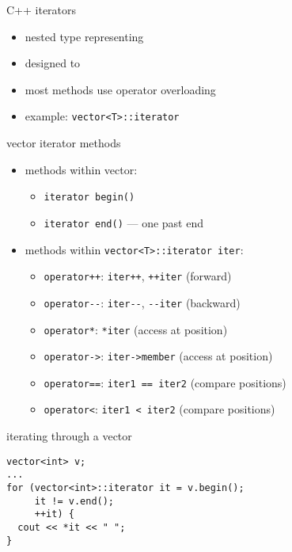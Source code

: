 \begin{frame}{C++ iterators}
    \begin{itemize}
        \item nested type representing 
        \item designed to 
        \item most methods use operator overloading
        \item example: \texttt{vector<T>::iterator}
    \end{itemize}
\end{frame}

\begin{frame}[fragile,label=itMethods]{vector iterator methods}
\lstset{
    language=C++,
    style=smaller,
}
\begin{itemize}
\item methods within vector:
    \begin{itemize}
    \item \lstinline|iterator begin()|
    \item \lstinline|iterator end()| --- one past end
    \end{itemize}
\item methods within \lstinline|vector<T>::iterator iter|:
    \begin{itemize}
        \item \lstinline|operator++|: \lstinline|iter++|, \lstinline|++iter| (forward)
        \item \lstinline|operator--|: \lstinline|iter--|, \lstinline|--iter| (backward)
            \item \lstinline|operator*|: \lstinline|*iter| (access at position)
            \item \lstinline|operator->|: \lstinline|iter->member| (access at position)
            \item \lstinline|operator==|: \lstinline|iter1 == iter2| (compare positions)
            \item \lstinline|operator<|: \lstinline|iter1 < iter2| (compare positions)
    \end{itemize}
\end{itemize}
\end{frame}

\begin{frame}[fragile,label=itInVector]{iterating through a vector}
\lstset{
    language=C++,
    style=small
}
\begin{lstlisting}
vector<int> v;
...
for (vector<int>::iterator it = v.begin();
     it != v.end();
     ++it) {
  cout << *it << " ";
}
\end{lstlisting}
\end{frame}

